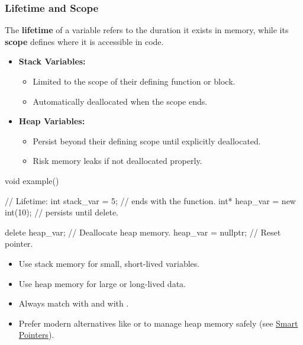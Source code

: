 \subsubsection{Lifetime and Scope}

The \textbf{lifetime} of a variable refers to the duration it exists in memory, while its \textbf{scope} defines where it is accessible in code.

\begin{itemize}
    \item \textbf{Stack Variables:}
    \begin{itemize}
        \item Limited to the scope of their defining function or block.
        \item Automatically deallocated when the scope ends.
    \end{itemize}

    \item \textbf{Heap Variables:}
    \begin{itemize}
        \item Persist beyond their defining scope until explicitly deallocated.
        \item Risk memory leaks if not deallocated properly.
    \end{itemize}
\end{itemize}

\begin{exampleblock}
    \begin{codeblock}[language=C++]
void example() {                  //        Lifetime:
    int stack_var = 5;            // ends with the function.
    int* heap_var = new int(10);  // persists until delete.

    delete heap_var;      // Deallocate heap memory.
    heap_var = nullptr;   // Reset pointer.
}
    \end{codeblock}
\end{exampleblock}

\begin{tipsblock}
    \begin{itemize}
        \item Use stack memory for small, short-lived variables.
        \item Use heap memory for large or long-lived data.
        \item Always match  with  and  with .
        \item Prefer modern alternatives like  or  to manage heap memory safely (see \hyperref[sec:smart_pointers]{Smart Pointers}).
    \end{itemize}
\end{tipsblock}


